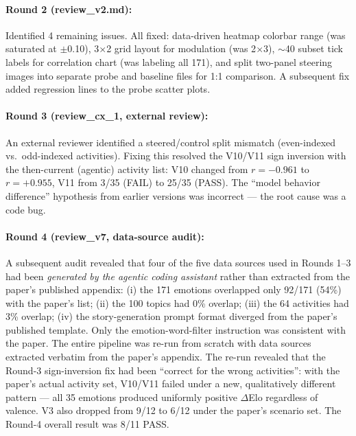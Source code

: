 \documentclass[11pt,a4paper]{article}
\begin{document}
\paragraph{Round 2 (review\_v2.md):} Identified 4 remaining issues.
All fixed: data-driven heatmap colorbar range (was saturated at
$\pm$0.10), 3$\times$2 grid layout for modulation (was 2$\times$3),
$\sim$40 subset tick labels for correlation chart (was labeling all
171), and split two-panel steering images into separate probe and
baseline files for 1:1 comparison.  A subsequent fix added regression
lines to the probe scatter plots.

\paragraph{Round 3 (review\_cx\_1, external review):} An external
reviewer identified a steered/control split mismatch
(even-indexed vs.\ odd-indexed activities).  Fixing this resolved the
V10/V11 sign inversion with the then-current (agentic) activity list:
V10 changed from $r{=}-0.961$ to $r{=}+0.955$, V11 from 3/35 (FAIL) to
25/35 (PASS).  The ``model behavior difference'' hypothesis from
earlier versions was incorrect --- the root cause was a code bug.

\paragraph{Round 4 (review\_v7, data-source audit):} A subsequent
audit revealed that four of the five data sources used in Rounds 1--3
had been \emph{generated by the agentic coding assistant} rather than
extracted from the paper's published appendix:
(i) the 171 emotions overlapped only 92/171 (54\%) with the paper's
list;
(ii) the 100 topics had 0\% overlap;
(iii) the 64 activities had 3\% overlap;
(iv) the story-generation prompt format diverged from the paper's
published template.
Only the emotion-word-filter instruction was consistent with the
paper.  The entire pipeline was re-run from scratch with data sources
extracted verbatim from the paper's appendix.  The re-run revealed
that the Round-3 sign-inversion fix had been ``correct for the wrong
activities'': with the paper's actual activity set, V10/V11 failed
under a new, qualitatively different pattern --- all 35 emotions
produced uniformly positive $\Delta$Elo regardless of valence.
V3 also dropped from 9/12 to 6/12 under the paper's scenario set.
The Round-4 overall result was 8/11 PASS.
\end{document}
